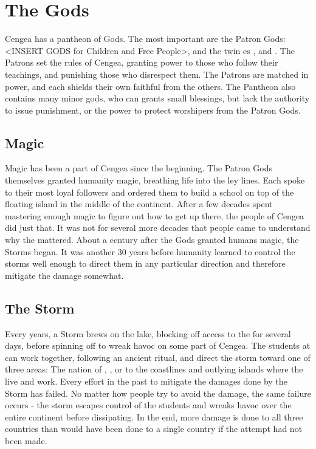 \documentclass[blue]{GL2020}
\begin{document}

\section*{The Gods}
Cengea has a pantheon of Gods. The most important are the Patron Gods: <INSERT GODS for Children and Free People>, and the twin \cEbb{\God}es \cEbbFull{}, and \cFlowFull{}. The Patrons set the rules of Cengea, granting power to those who follow their teachings, and punishing those who disrespect them. The Patrons are matched in power, and each shields their own faithful from the others. The Pantheon also contains many minor gods, who can grants small blessings, but lack the authority to issue punishment, or the power to protect worshipers from the Patron Gods.

\subsection*{Magic}
Magic has been a part of Cengea since the beginning. The Patron Gods themselves granted humanity magic, breathing life into the ley lines. Each spoke to their most loyal followers and ordered them to build a school on top of the floating island in the middle of the continent. After a few decades spent mastering enough magic to figure out how to get up there, the people of Cengea did just that. It was not for several more decades that people came to understand why the \pSc{} mattered. About a century after the Gods granted humans magic, the Storms began. It was another 30 years before humanity learned to control the storms well enough to direct them in any particular direction and therefore mitigate the damage somewhat.


\subsection*{The Storm}
Every \pCycle{} years, a Storm brews on the lake, blocking off access to the \pSc{} for several days, before spinning off to wreak havoc on some part of Cengea. The students at \pSchool{} can work together, following an ancient ritual, and direct the storm toward one of three areas: The nation of \pFarm{}, \pTech{}, or to the coastlines and outlying islands where the \pShippies{} live and work. Every effort in the past to mitigate the damages done by the Storm has failed. No matter how people try to avoid the damage, the same failure occurs - the storm escapes control of the students and wreaks havoc over the entire continent before dissipating. In the end, more damage is done to all three countries than would have been done to a single country if the attempt had not been made. 
\end{document}
